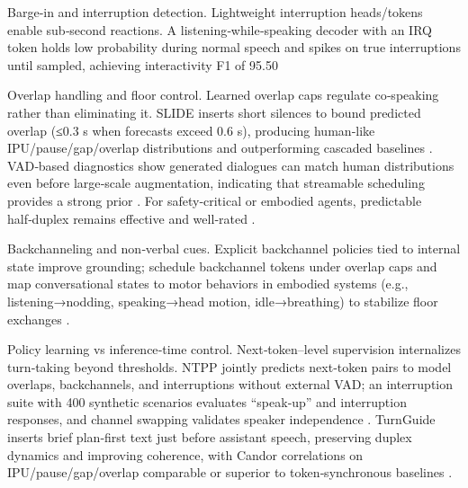 \documentclass{article}
\begin{document}
Barge‑in and interruption detection. Lightweight interruption heads/tokens enable sub‑second reactions. A listening‑while‑speaking decoder with an IRQ token holds low probability during normal speech and spikes on true interruptions until sampled, achieving interactivity F1 of 95.50%

Overlap handling and floor control. Learned overlap caps regulate co‑speaking rather than eliminating it. SLIDE inserts short silences to bound predicted overlap (≤0.3 s when forecasts exceed 0.6 s), producing human‑like IPU/pause/gap/overlap distributions and outperforming cascaded baselines \cite{lu2025slideintegratingspeechlanguagemodelllmsp}. VAD‑based diagnostics show generated dialogues can match human distributions even before large‑scale augmentation, indicating that streamable scheduling provides a strong prior \cite{fu2024investigatingeffectslargescalepseudoster}. For safety‑critical or embodied agents, predictable half‑duplex remains effective and well‑rated \cite{fu2025personalizedsociallyassistiverobotsendsp}.

Backchanneling and non‑verbal cues. Explicit backchannel policies tied to internal state improve grounding; schedule backchannel tokens under overlap caps and map conversational states to motor behaviors in embodied systems (e.g., listening→nodding, speaking→head motion, idle→breathing) to stabilize floor exchanges \cite{lu2025slideintegratingspeechlanguagemodelllmsp,fu2025personalizedsociallyassistiverobotsendsp}.

Policy learning vs inference‑time control. Next‑token–level supervision internalizes turn‑taking beyond thresholds. NTPP jointly predicts next‑token pairs to model overlaps, backchannels, and interruptions without external VAD; an interruption suite with 400 synthetic scenarios evaluates “speak‑up” and interruption responses, and channel swapping validates speaker independence \cite{wang2025ntppgenerativespeechlanguagemodelingdual}. TurnGuide inserts brief plan‑first text just before assistant speech, preserving duplex dynamics and improving coherence, with Candor correlations on IPU/pause/gap/overlap comparable or superior to token‑synchronous baselines \cite{cui2025thinkbeforeyoutalkenhancingmeaningfuldia}.
\end{document}
